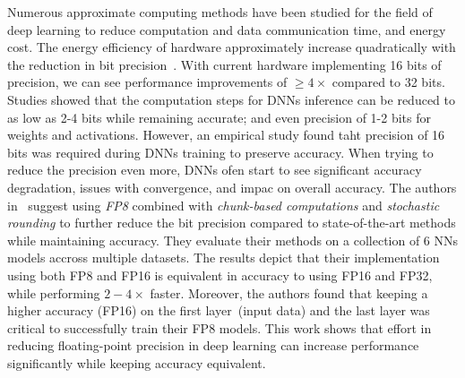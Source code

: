 Numerous approximate computing methods have been studied for the field of deep 
learning to reduce computation and data communication time, and energy cost.
The energy efficiency of hardware approximately increase quadratically with the reduction in bit precision~\cite{Wang2018-oo}.
With current hardware implementing 16 bits of precision, we can see performance improvements of $\ge 4\times$ compared to 32 bits.
Studies showed that the computation steps for DNNs inference can be reduced to as low as 2-4 bits
while remaining accurate; and even precision of 1-2 bits for weights and activations.
However, an empirical study found taht precision of 16 bits was required during 
DNNs training to preserve accuracy.
When trying to reduce the precision even more, DNNs ofen start to see significant 
accuracy degradation, issues with convergence, and impac on overall accuracy.
The authors in~\cite{Wang2018-oo} suggest using \textit{FP8} combined with 
\textit{chunk-based computations} and \textit{stochastic rounding} to further reduce
the bit precision compared to state-of-the-art methods while maintaining accuracy.
They evaluate their methods on a collection of 6 NNs models accross multiple datasets.
The results depict that their implementation using both FP8 and FP16 is equivalent
in accuracy to using FP16 and FP32, while performing $2-4\times$ faster.
Moreover, the authors found that keeping a higher accuracy (FP16) on the first layer~(input data)
and the last layer was critical to successfully train their FP8 models.
This work shows that effort in reducing floating-point precision in deep learning
can increase performance significantly while keeping accuracy equivalent.


